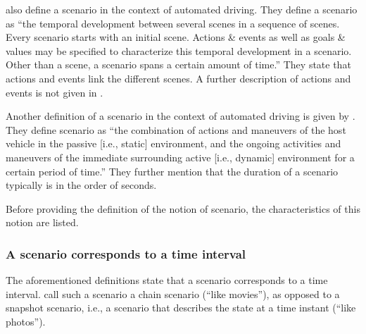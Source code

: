 \textcite{ulbrich2015} also define a scenario in the context of automated driving. They define a scenario as ``the temporal development between several scenes in a sequence of scenes. Every scenario starts with an initial scene. Actions \& events as well as goals \& values may be specified to characterize this temporal development in a scenario. Other than a scene, a scenario spans a certain amount of time.'' They state that actions and events link the different scenes. A further description of actions and events is not given in \cite{ulbrich2015}.

Another definition of a scenario in the context of automated driving is given by \textcite{elrofai2016scenario}. They define scenario as ``the combination of actions and maneuvers of the host vehicle in the passive [i.e., static] environment, and the ongoing activities and maneuvers of the immediate surrounding active [i.e., dynamic] environment for a certain period of time.'' They further mention that the duration of a scenario typically is in the order of seconds.

Before providing the definition of the notion of scenario, the characteristics of this notion are listed.

\subsubsection{A scenario corresponds to a time interval}
The aforementioned definitions \cite{go2004blind, geyer2014, ulbrich2015, elrofai2016scenario} state that a scenario corresponds to a time interval. \textcite{vannotten2003updated} call such a scenario a chain scenario (``like movies''), as opposed to a snapshot scenario, i.e., a scenario that describes the state at a time instant (``like photos''). %

